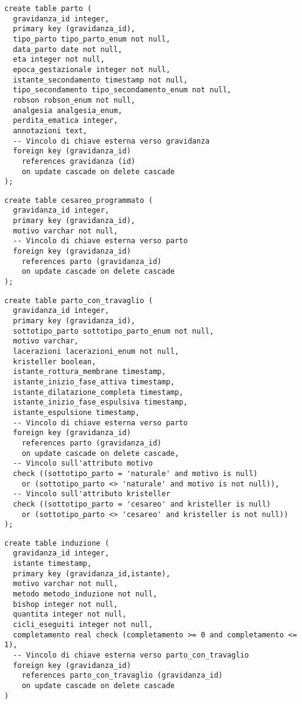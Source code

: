 \begin{lstlisting}[float,caption={Definizione della tabella \tab{parto}.},label=ptabparto]
create table parto (
  gravidanza_id integer,
  primary key (gravidanza_id),
  tipo_parto tipo_parto_enum not null,
  data_parto date not null,
  eta integer not null,
  epoca_gestazionale integer not null,
  istante_secondamento timestamp not null,
  tipo_secondamento tipo_secondamento_enum not null,
  robson robson_enum not null,
  analgesia analgesia_enum,
  perdita_ematica integer,
  annotazioni text,
  -- Vincolo di chiave esterna verso gravidanza
  foreign key (gravidanza_id)
    references gravidanza (id)
    on update cascade on delete cascade
);
\end{lstlisting}

\begin{lstlisting}[float,caption={Definizione della tabella \tab{cesareo\_programmato}.},label=ptabcesareoprogrammato]
create table cesareo_programmato (
  gravidanza_id integer,
  primary key (gravidanza_id),
  motivo varchar not null,
  -- Vincolo di chiave esterna verso parto
  foreign key (gravidanza_id)
    references parto (gravidanza_id)
    on update cascade on delete cascade
);
\end{lstlisting}

\begin{lstlisting}[float,caption={Definizione della tabella \tab{parto\_con\_travaglio}.},label=ptabpartocontravaglio]
create table parto_con_travaglio (
  gravidanza_id integer,
  primary key (gravidanza_id),
  sottotipo_parto sottotipo_parto_enum not null,
  motivo varchar,
  lacerazioni lacerazioni_enum not null,
  kristeller boolean,
  istante_rottura_membrane timestamp,
  istante_inizio_fase_attiva timestamp,
  istante_dilatazione_completa timestamp,
  istante_inizio_fase_espulsiva timestamp,
  istante_espulsione timestamp,
  -- Vincolo di chiave esterna verso parto
  foreign key (gravidanza_id)
    references parto (gravidanza_id)
    on update cascade on delete cascade,
  -- Vincolo sull'attributo motivo
  check ((sottotipo_parto = 'naturale' and motivo is null)
    or (sottotipo_parto <> 'naturale' and motivo is not null)),
  -- Vincolo sull'attributo kristeller
  check ((sottotipo_parto = 'cesareo' and kristeller is null)
    or (sottotipo_parto <> 'cesareo' and kristeller is not null))
);
\end{lstlisting}

\begin{lstlisting}[float,caption={Definizione della tabella \tab{induzione}.},label=ptabinduzione]
create table induzione (
  gravidanza_id integer,
  istante timestamp,
  primary key (gravidanza_id,istante),
  motivo varchar not null,
  metodo metodo_induzione not null,
  bishop integer not null,
  quantita integer not null,
  cicli_eseguiti integer not null,
  completamento real check (completamento >= 0 and completamento <= 1),
  -- Vincolo di chiave esterna verso parto_con_travaglio
  foreign key (gravidanza_id)
    references parto_con_travaglio (gravidanza_id)
    on update cascade on delete cascade
)
\end{lstlisting}

